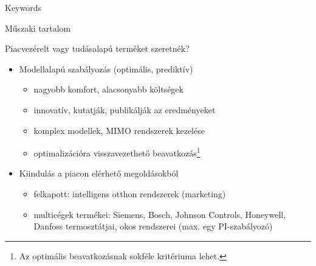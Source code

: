 \documentclass[14pt]{beamer}
\begin{document}
\begin{frame}{Keywords}

\end{frame}


\begin{frame}{Műszaki tartalom}

Piacvezérelt vagy tudásalapú terméket szeretnék?

\begin{itemize}
	\setlength{\itemsep}{7pt}
	\item Modellalapú szabályozás (optimális, prediktív)
	\begin{itemize}
		\item nagyobb komfort, alacsonyabb költségek
		\item innovatív, kutatják, publikálják az eredményeket
		\item komplex modellek, MIMO rendszerek kezelése
		\item optimalizációra visszavezethető beavatkozás\footnote{Az optimális beavatkozásnak sokféle kritériuma lehet.}
	\end{itemize}
	\item Kiindulás a piacon elérhető megoldásokból
	\begin{itemize}
		\item felkapott: intelligens otthon rendszerek (marketing)
		\item multicégek termékei: Siemens, Bosch, Johnson Controls, Honeywell, Danfoss termosztátjai, okos rendszerei (max. egy PI-szabályozó)
	\end{itemize}
\end{itemize}
\end{frame}
\end{document}
